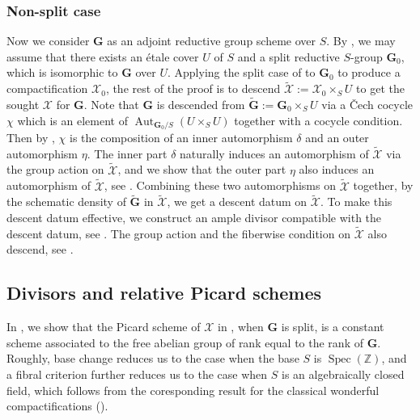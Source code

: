 \documentclass[11pt, reqno]{amsart}
\theoremstyle{plain}
\theoremstyle{definition}
\DeclareMathOperator{\Aut}{\mathrm{Aut}}		%
\DeclareMathOperator{\Spec}{Spec}		%
\begin{document}
\subsubsection{Non-split case} Now we consider $\mathbf{G}$ as an adjoint reductive group scheme over $S$. By \cite[exposé~XXII, corollaire~2.3]{SGA3III}, we may assume that there exists an étale cover $U$ of $S$ and a split reductive $S$-group $\mathbf{G}_0$, which is isomorphic to $\mathbf{G}$ over $U$. Applying the split case of  to $\mathbf{G}_0$ to produce a compactification $\mathcal{X}_0$, the rest of the proof is to descend $\widetilde{\mathcal{X}}:=\mathcal{X}_0\times_S U$ to get the sought $\mathcal{X}$ for $\mathbf{G}$. 
Note that $\mathbf{G}$ is descended from $\widetilde{\mathbf{G}}:=\mathbf{G}_0\times_S U$ via a \v{C}ech cocycle $\chi$ which is an element of $\Aut_{\mathbf{G}_0/S}(U\times_S U)$ together with a cocycle condition. Then by \cite[exposé~XXIV, théoreme~1.3]{SGA3III}, $\chi$ is the composition of an inner automorphism $\delta$ and an outer automorphism $\eta$. The inner part $\delta$ naturally induces an automorphism of $\widetilde{\mathcal{X}}$ via the group action on $\widetilde{\mathcal{X}}$, and we show that the outer part $\eta$ also induces an automorphism of $\widetilde{\mathcal{X}}$, see . Combining these two automorphisms on $\widetilde{\mathcal{X}}$ together, by the schematic density of $\widetilde{\mathbf{G}}$ in $\widetilde{\mathcal{X}}$, we get a descent datum on $\widetilde{\mathcal{X}}$. To make this descent datum effective, we construct an ample divisor compatible with the descent datum, see . The group action and the fiberwise condition on $\widetilde{\mathcal{X}}$ also descend, see .
    

\subsection{Divisors and relative Picard schemes}
In , we show that the Picard scheme of $\mathcal{X}$ in , when $\mathbf{G}$ is split, is a constant scheme associated to the free abelian group of rank equal to the rank of $\mathbf{G}$. Roughly, base change reduces us to the case when the base $S$ is $\Spec(\mathbb{Z})$, and a fibral criterion \cite[Corollaire 17.9.5]{EGAIV4} further reduces us to the case when $S$ is an algebraically closed field, which follows from the coresponding result for the classical wonderful compactifications (\cite[Lemma 6.19]{BrionKumar}).
\end{document}
